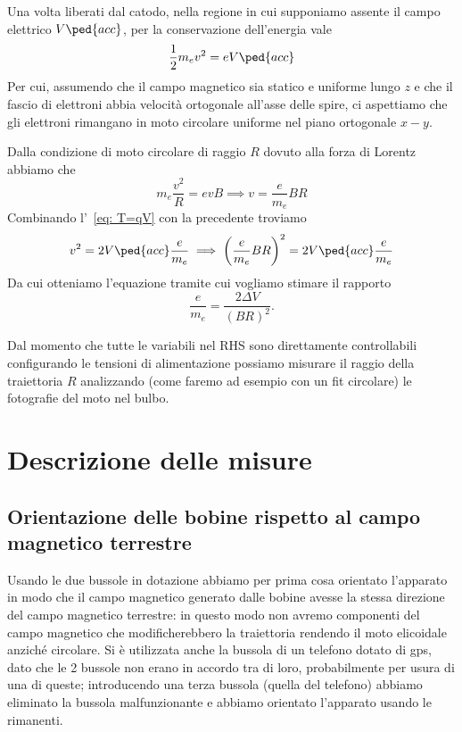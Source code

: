 \documentclass[10pt, a4paper, italian]{article}
\begin{document}
Una volta liberati dal catodo, nella regione in cui supponiamo assente il
campo elettrico $V\ped{acc}$, per la conservazione dell'energia vale
\begin{equation}\label{eq: T=qV}
    \frac{1}{2} m_{e} v^{2} = e V\ped{acc}
\end{equation}
Per cui, assumendo che il campo magnetico sia statico e uniforme lungo $z$ e
che il fascio di elettroni abbia velocità ortogonale all'asse delle spire,
ci aspettiamo che gli elettroni rimangano in moto circolare uniforme nel
piano ortogonale $x-y$.

Dalla condizione di moto circolare di raggio $R$ dovuto alla forza di Lorentz
abbiamo che
\[
m_{e} \frac{v^2}{R} = e v B \implies v = \frac{e}{m_e} B R
\]
Combinando l'~\cref{eq: T=qV} con la precedente troviamo
\[
v^2 = 2 V\ped{acc} \frac{e}{m_e} \implies \left(\frac{e}{m_e} B R\right)^2 =
2 V\ped{acc} \frac{e}{m_e}
\]
Da cui otteniamo l'equazione tramite cui vogliamo stimare il rapporto
\begin{equation}\label{eq: fit}
\frac{e}{m_{e}} = \frac{2 \Delta V}{(BR)^2}.
\end{equation}

Dal momento che tutte le variabili nel RHS sono direttamente controllabili
configurando le tensioni di alimentazione possiamo misurare il raggio
della traiettoria $R$ analizzando (come faremo ad esempio con un fit
circolare) le fotografie del moto nel bulbo.

\section{Descrizione delle misure}
\subsection{Orientazione delle bobine rispetto al campo magnetico terrestre}
Usando le due bussole in dotazione abbiamo per
prima cosa orientato l'apparato in modo che il campo magnetico generato dalle
bobine avesse la stessa direzione del campo magnetico terrestre: in questo modo non avremo componenti del campo magnetico che modificherebbero la traiettoria rendendo il moto elicoidale anziché circolare.
Si è utilizzata anche la bussola di un telefono dotato di gps, dato che le 2 bussole non erano in accordo tra di loro, probabilmente per usura di una di queste; introducendo una terza bussola (quella del telefono) abbiamo eliminato la bussola malfunzionante e abbiamo orientato l'apparato usando le rimanenti.
\end{document}
